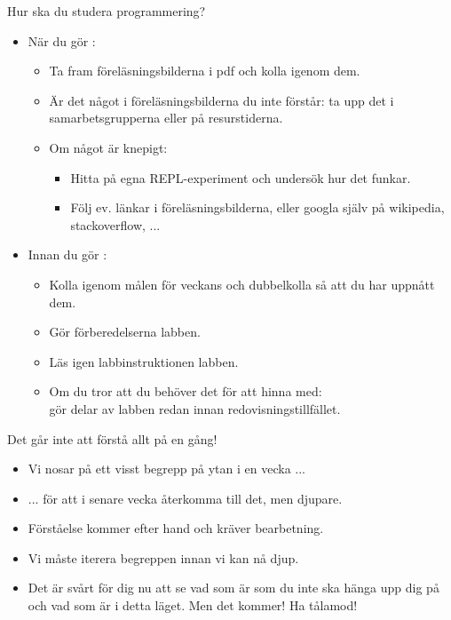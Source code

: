 \begin{Slide}{Hur ska du studera programmering?}
\begin{itemize}
\item När du gör :
\begin{itemize}
\item Ta fram föreläsningsbilderna i pdf och kolla igenom dem.
\item Är det något i föreläsningsbilderna du inte förstår: ta upp det i samarbetsgrupperna eller på resurstiderna.
\item Om något är knepigt: 
\begin{itemize}
\item Hitta på egna REPL-experiment och undersök hur det funkar.
\item Följ ev. länkar i föreläsningsbilderna, eller googla själv på wikipedia, stackoverflow, ...
\end{itemize}
\end{itemize}

\item Innan du gör :
\begin{itemize}
\item Kolla igenom målen för veckans  och dubbelkolla så att du har uppnått dem.
\item Gör förberedelserna  labben.
\item Läs igen  labbinstruktionen  labben.
\item Om du tror att du behöver det för att hinna med: \\ gör delar av labben redan innan redovisningstillfället.
\end{itemize}
\end{itemize}

\end{Slide}

\begin{Slide}{Det går inte att förstå allt på en gång!}
\begin{itemize}
\item Vi nosar på ett visst begrepp på ytan i en vecka ... 

\item ... för att i senare vecka återkomma till det, men djupare.

\item Förståelse kommer efter hand och kräver bearbetning.

\item Vi måste iterera begreppen innan vi kan nå djup.

\pause\item Det är svårt för dig nu att se vad som är  som du inte ska hänga upp dig på och vad som är  i detta läget. Men det kommer! Ha tålamod! 
\end{itemize}

\end{Slide}


